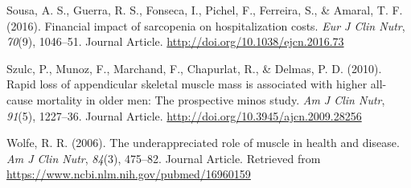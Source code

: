 \documentclass[twoside,10pt]{gihclass} %
\begin{document}
\leavevmode\hypertarget{ref-RN2532}{}%
Sousa, A. S., Guerra, R. S., Fonseca, I., Pichel, F., Ferreira, S., \& Amaral, T. F. (2016). Financial impact of sarcopenia on hospitalization costs. \emph{Eur J Clin Nutr}, \emph{70}(9), 1046--51. Journal Article. \url{http://doi.org/10.1038/ejcn.2016.73}

\leavevmode\hypertarget{ref-RN2515}{}%
Szulc, P., Munoz, F., Marchand, F., Chapurlat, R., \& Delmas, P. D. (2010). Rapid loss of appendicular skeletal muscle mass is associated with higher all-cause mortality in older men: The prospective minos study. \emph{Am J Clin Nutr}, \emph{91}(5), 1227--36. Journal Article. \url{http://doi.org/10.3945/ajcn.2009.28256}

\leavevmode\hypertarget{ref-RN763}{}%
Wolfe, R. R. (2006). The underappreciated role of muscle in health and disease. \emph{Am J Clin Nutr}, \emph{84}(3), 475--82. Journal Article. Retrieved from \url{https://www.ncbi.nlm.nih.gov/pubmed/16960159}


\end{document}
